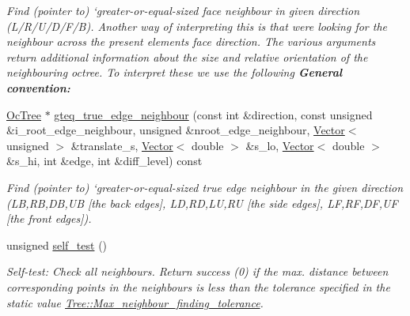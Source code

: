 \begin{DoxyCompactItemize}
\begin{DoxyCompactList}\small\item\em Find (pointer to) `greater-\/or-\/equal-\/sized face neighbour\textquotesingle{} in given direction (L/\+R/\+U/\+D/\+F/B). Another way of interpreting this is that we\textquotesingle{}re looking for the neighbour across the present element\textquotesingle{}s face \textquotesingle{}direction\textquotesingle{}. The various arguments return additional information about the size and relative orientation of the neighbouring octree. To interpret these we use the following {\bfseries General convention\+:} \end{DoxyCompactList}\item 
\hyperlink{classoomph_1_1OcTree}{Oc\+Tree} $\ast$ \hyperlink{classoomph_1_1OcTree_ab5a26409cd49a430095915c76060f476}{gteq\+\_\+true\+\_\+edge\+\_\+neighbour} (const int \&direction, const unsigned \&i\+\_\+root\+\_\+edge\+\_\+neighbour, unsigned \&nroot\+\_\+edge\+\_\+neighbour, \hyperlink{classoomph_1_1Vector}{Vector}$<$ unsigned $>$ \&translate\+\_\+s, \hyperlink{classoomph_1_1Vector}{Vector}$<$ double $>$ \&s\+\_\+lo, \hyperlink{classoomph_1_1Vector}{Vector}$<$ double $>$ \&s\+\_\+hi, int \&edge, int \&diff\+\_\+level) const
\begin{DoxyCompactList}\small\item\em Find (pointer to) `greater-\/or-\/equal-\/sized true edge neighbour\textquotesingle{} in the given direction (LB,RB,DB,UB \mbox{[}the back edges\mbox{]}, LD,RD,LU,RU \mbox{[}the side edges\mbox{]}, LF,RF,DF,UF \mbox{[}the front edges\mbox{]}). \end{DoxyCompactList}\item 
unsigned \hyperlink{classoomph_1_1OcTree_a68218b6e02594bef23cb141af8a19ffb}{self\+\_\+test} ()
\begin{DoxyCompactList}\small\item\em Self-\/test\+: Check all neighbours. Return success (0) if the max. distance between corresponding points in the neighbours is less than the tolerance specified in the static value \hyperlink{classoomph_1_1Tree_aef9abebc166fa3bf81ecb59ec0d5d6b2}{Tree\+::\+Max\+\_\+neighbour\+\_\+finding\+\_\+tolerance}. \end{DoxyCompactList}\end{DoxyCompactItemize}
